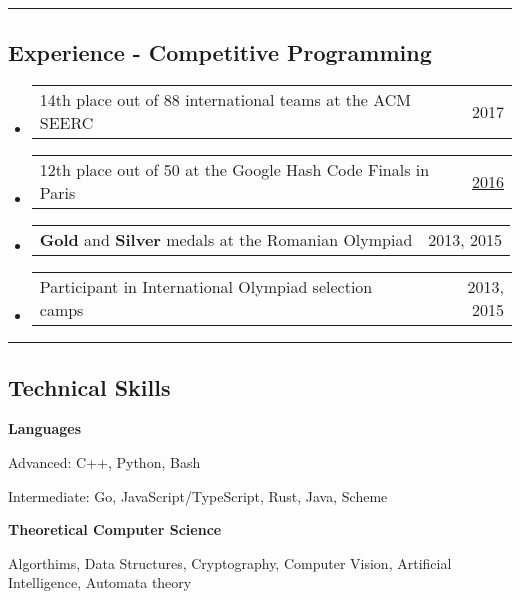 \documentclass[10pt,letterpaper]{article}
\makeatletter
\newenvironment{indentsection}[1]%
{\begin{list}{}%
	{\setlength{\leftmargin}{#1}}%
	\item[]%
}
{\end{list}}
\newcommand{\headerrow}[2]
{\begin{tabular*}{\linewidth}{l@{\extracolsep{\fill}}r}
	#1 &
	#2 \\
\end{tabular*}}
\makeatother
\begin{document}
\hrule

\vspace{-1em}

\subsection*{Experience - Competitive Programming}
\begin{itemize}
	\parskip=0.1em
		\item
		\headerrow
			{14th place out of 88 international teams at the ACM SEERC}
			{2017}

		\item
		\headerrow
			{12th place out of 50 at the Google Hash Code Finals in Paris}
            {\href{https://hashcode.withgoogle.com/hashcode_2016.html}{2016}}

        \item
		\headerrow
            {\textbf{Gold} and \textbf{Silver} medals at the Romanian Olympiad}
			{2013, 2015}

        \item
		\headerrow
            {Participant in International Olympiad selection camps}
			{2013, 2015}

\end{itemize}

\hrule
\vspace{-1em}

\subsection*{Technical Skills}

\begin{indentsection}{\parindent}
\begin{description*}
	\item
	{\textbf{Languages}}

	\begin{itemize*}
        \item {Advanced: C++, Python, Bash}
        \item {Intermediate: Go, JavaScript/TypeScript, Rust, Java, Scheme}
	\end{itemize*}

	\item
	{\textbf{Theoretical Computer Science}}

	Algorthims, Data Structures, Cryptography, Computer Vision, Artificial Intelligence, Automata theory
\end{description*}
\end{indentsection}
\end{document}

